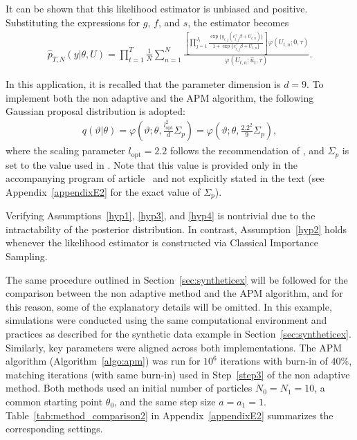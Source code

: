 \documentclass[pdflatex,sn-mathphys-num]{sn-jnl}
\newcommand{\textopt}{\text{opt}}
\theoremstyle{thmstyleone}
\theoremstyle{thmstyletwo}
\theoremstyle{thmstylethree}
\begin{document}
It can be shown that this likelihood estimator is unbiased and positive. Substituting the expressions for \( g \), \( f \), and \( s \), the estimator becomes
\begin{align}
    \widehat{p}_{T,N}(y | \theta, U) 
= \prod_{t=1}^T \frac{1}{N} \sum_{n=1}^N 
\frac{\left[ \prod_{j=1}^{J_t} \frac{\exp\{y_{t,j}(c_{t,j}^\top \beta + U_{t,n})\}}{1 + \exp\{c_{t,j}^\top \beta + U_{t,n}\}} \right] \varphi(U_{t,n}; 0, \tau)}{\varphi(U_{t,n}; \hat{u}_t, \tau)}.
\label{re:estim}
\end{align}


In this application, it is recalled that the parameter dimension is \( d = 9 \). To implement both the non adaptive and the APM algorithm, the following Gaussian proposal distribution is adopted:
\begin{align}
    q(\vartheta |\theta) = \varphi\left(\vartheta; \theta, \frac{l_\textopt^2}{d}{\Sigma}_p\right) = \varphi\left(\vartheta; \theta, \frac{2.2^2}{9}{\Sigma}_p\right),
    \label{intru2}
\end{align}
where the scaling parameter \( l_{\text{opt}} = 2.2 \) follows the recommendation of \cite{schmon_large-sample_2021}, 
and \( \Sigma_p \) is set to the value used in \cite{schmon_large-sample_2021}. Note that this value is provided only in the accompanying program of article~\cite{schmon_large-sample_2021} and not explicitly stated in the text 
(see Appendix~\ref{appendixE2} for the exact value of \( \Sigma_p \)).

Verifying Assumptions~\ref{hyp1}, \ref{hyp3}, and \ref{hyp4} is nontrivial due to the intractability of the posterior distribution. In contrast, Assumption~\ref{hyp2} holds whenever the likelihood estimator is constructed via Classical Importance Sampling.

The same procedure outlined in Section~\ref{sec:syntheticex} will be followed for the comparison between the non adaptive method and the APM algorithm, and for this reason, some of the explanatory details will be omitted. In this example, simulations were conducted using the same computational environment and practices as described for the synthetic data example in Section~\ref{sec:syntheticex}. Similarly, key parameters were aligned across both implementations. The APM algorithm (Algorithm~\ref{algo:apm}) was run for \(10^6\) iterations with burn-in of $40\%$, matching iterations (with same burn-in) used in Step~\ref{step3} of the non adaptive method. Both methods used an initial number of particles \( N_0 = N_1 = 10 \), a common starting point \( \theta_0 \), and the same step size \( a = a_1 = 1 \). Table~\ref{tab:method_comparison2} in Appendix~\ref{appendixE2} summarizes the corresponding settings.
\end{document}
